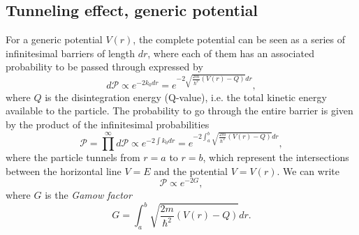 \subsection{Tunneling effect, generic potential}
For a generic potential \(V(r)\), the complete potential can be seen as a series of infinitesimal barriers of length \(dr\), where each of them has an associated probability to be passed through expressed by
\begin{equation*}
    d\mathcal{P} \propto e^{-2k_0dr} = e^{-2\sqrt{\frac{2m}{\hslash^2}(V(r)-Q)}dr},
\end{equation*}
where \(Q\) is the disintegration energy (Q-value), i.e. the total kinetic energy available to the particle.
The probability to go through the entire barrier is given by the product of the infinitesimal probabilities
\begin{equation*}
    \mathcal{P}=\prod^\infty d\mathcal{P}\propto e^{-2\int k_0 dr} = e^{-2\int_a^b\sqrt{\frac{2m}{\hslash^2}(V(r)-Q)}dr},
\end{equation*}
where the particle tunnels from \(r=a\) to \(r=b\), which represent the intersections between the horizontal line \(V=E\) and the potential \(V=V(r)\).
We can write
\begin{equation*}
    \mathcal{P} \propto e^{-2G},
\end{equation*}
where $G$ is the \emph{Gamow factor}
\begin{equation*}
    G = \int_a^b\sqrt{\frac{2m}{\hslash^2}(V(r)-Q)}dr.
\end{equation*}

